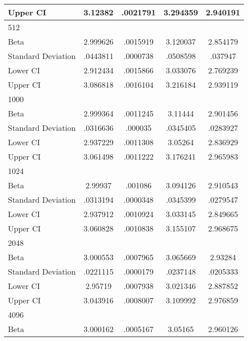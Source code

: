 {\begin{tabular}{l*{1}{cccc}}
Upper CI            &     3.12382&    .0021791&    3.294359&    2.940191\\
\hline
512                 &            &            &            &            \\
Beta                &    2.999626&    .0015919&    3.120037&    2.854179\\
Standard Deviation  &    .0443811&    .0000738&    .0508598&     .037947\\
Lower CI            &    2.912434&    .0015866&    3.033076&    2.769239\\
Upper CI            &    3.086818&    .0016104&    3.216184&    2.939119\\
\hline
1000                &            &            &            &            \\
Beta                &    2.999364&    .0011245&     3.11444&    2.901456\\
Standard Deviation  &    .0316636&     .000035&    .0345405&    .0283927\\
Lower CI            &    2.937229&    .0011308&     3.05264&    2.836929\\
Upper CI            &    3.061498&    .0011222&    3.176241&    2.965983\\
\hline
1024                &            &            &            &            \\
Beta                &     2.99937&     .001086&    3.094126&    2.910543\\
Standard Deviation  &    .0313194&    .0000348&    .0345399&    .0279547\\
Lower CI            &    2.937912&    .0010924&    3.033145&    2.849665\\
Upper CI            &    3.060828&    .0010838&    3.155107&    2.968675\\
\hline
2048                &            &            &            &            \\
Beta                &    3.000553&    .0007965&    3.065669&     2.93284\\
Standard Deviation  &    .0221115&    .0000179&    .0237148&    .0205333\\
Lower CI            &     2.95719&    .0007938&    3.021346&    2.887852\\
Upper CI            &    3.043916&    .0008007&    3.109992&    2.976859\\
\hline
4096                &            &            &            &            \\
Beta                &    3.000162&    .0005167&     3.05165&    2.960126\\

\end{tabular}}
